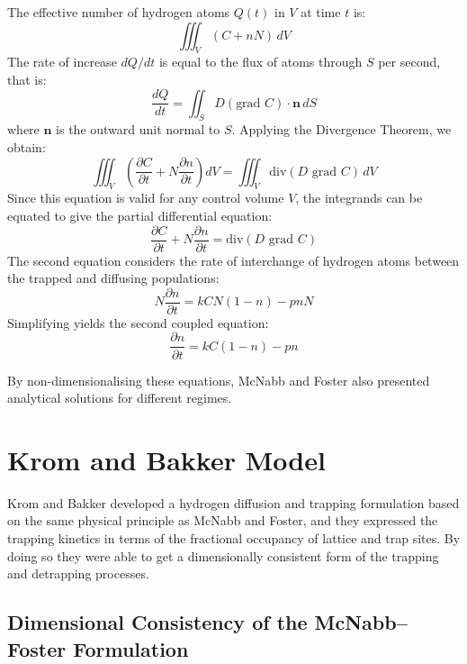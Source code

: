 \documentclass[a4paper,12pt,oneside]{report}
\begin{document}
The effective number of hydrogen atoms $Q(t)$ in $V$ at time $t$ is:
\begin{equation*}
\iiint_V (C + nN) \, dV
\end{equation*}
The rate of increase $dQ/dt$ is equal to the flux of atoms through $S$ per second, that is:
\begin{equation*}
\frac{dQ}{dt} = \iint_S D(\text{grad } C) \cdot \mathbf{n} \, dS
\end{equation*}
where $\mathbf{n}$ is the outward unit normal to $S$. Applying the Divergence Theorem, we obtain:
\begin{equation*}
\iiint_V \left( \frac{\partial C}{\partial t} + N \frac{\partial n}{\partial t} \right) dV = \iiint_V \text{div}(D \text{ grad } C) \, dV
\end{equation*}
Since this equation is valid for any control volume $V$, the integrands can be equated to give the partial differential equation:
\begin{equation}
\frac{\partial C}{\partial t} + N \frac{\partial n}{\partial t} = \text{div}(D \text{ grad } C)
\label{eq:ch3_mf_pde}
\end{equation}
The second equation considers the rate of interchange of hydrogen atoms between the trapped and diffusing populations:
\begin{equation*}
N \frac{\partial n}{\partial t} = kCN(1 - n) - pnN
\end{equation*}
Simplifying yields the second coupled equation:
\begin{equation}
\frac{\partial n}{\partial t} = kC(1 - n) - pn
\label{eq:ch3_mf_trap}
\end{equation}

By non-dimensionalising these equations, McNabb and Foster also presented analytical solutions for different regimes.

\section{Krom and Bakker Model}

Krom and Bakker \cite{Krom2000} developed a hydrogen diffusion and trapping formulation based on the same physical principle as McNabb and Foster, and they expressed the trapping kinetics in terms of the fractional occupancy of lattice and trap sites. By doing so they were able to get a dimensionally consistent form of the trapping and detrapping processes.

\subsection{Dimensional Consistency of the McNabb--Foster Formulation}
\end{document}
